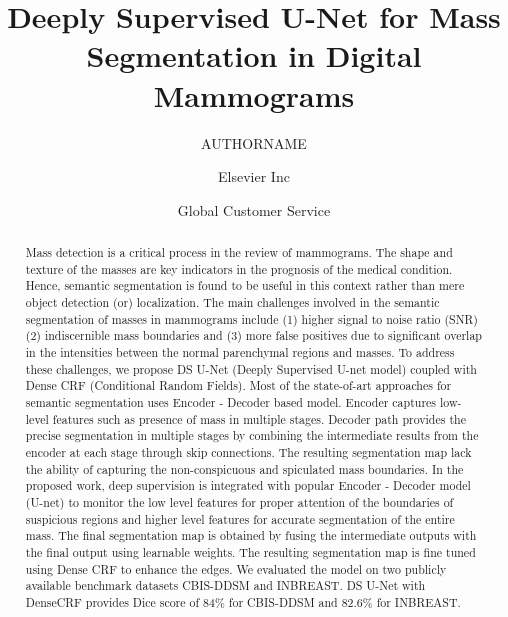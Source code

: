 \documentclass[review]{elsarticle}
\begin{document}
\begin{frontmatter}

\title{Deeply Supervised U-Net for Mass Segmentation in Digital Mammograms}

\author{AUTHORNAME}
\address{Radarweg 29, Amsterdam}


\author[mymainaddress,mysecondaryaddress]{Elsevier Inc}

\author[mysecondaryaddress]{Global Customer Service}

\address[mymainaddress]{1600 John F Kennedy Boulevard, Philadelphia}
\address[mysecondaryaddress]{360 Park Avenue South, New York}

\begin{abstract}
Mass detection is a critical process in the review of mammograms. The shape and texture of the masses are key indicators in the prognosis of the medical condition. Hence, semantic segmentation is found to be useful in this context rather than mere object detection (or) localization. The main challenges involved in the semantic segmentation of masses in mammograms include (1) higher signal to noise ratio (SNR) (2) indiscernible mass boundaries and (3) more false positives due to significant overlap in the intensities between the normal parenchymal regions and masses. To address these challenges, we propose DS U-Net (Deeply Supervised U-net model) coupled with Dense CRF (Conditional Random Fields). Most of the state-of-art approaches for semantic segmentation uses Encoder - Decoder based model. Encoder captures low-level features such as presence of mass in multiple stages. Decoder path provides the precise segmentation in multiple stages by combining the intermediate results from the encoder at each stage through skip connections. The resulting segmentation map lack the ability of capturing the non-conspicuous and spiculated mass boundaries. In the proposed work, deep supervision is integrated with popular Encoder - Decoder model (U-net) to monitor the low level features for proper attention of the boundaries of suspicious regions and higher level features for accurate segmentation of the entire mass. The final segmentation map is obtained by fusing the intermediate outputs with the final output using learnable weights. The resulting segmentation map is fine tuned using Dense CRF to enhance the edges. We evaluated the model on two publicly available benchmark datasets CBIS-DDSM and INBREAST. DS U-Net with DenseCRF provides Dice score of 84\% for CBIS-DDSM and 82.6\% for INBREAST.  
\end{abstract}


\end{frontmatter}
\end{document}
